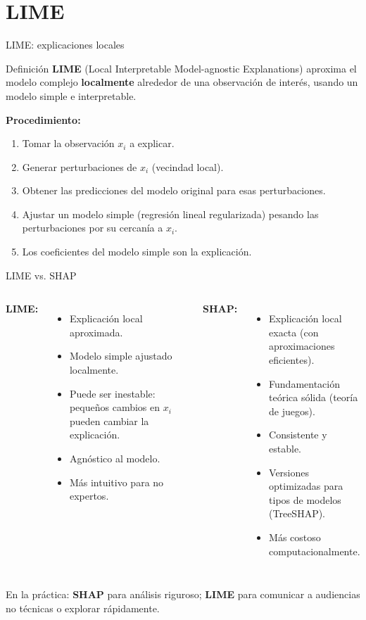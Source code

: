 \documentclass[aspectratio=169]{beamer}
\begin{document}
\section{LIME}

\begin{frame}{LIME: explicaciones locales}
  \begin{block}{Definición}
    \textbf{LIME} (Local Interpretable Model-agnostic Explanations) aproxima el modelo complejo \textbf{localmente} alrededor de una observación de interés, usando un modelo simple e interpretable.
  \end{block}

  \bigskip
  \textbf{Procedimiento:}
  \begin{enumerate}
    \item Tomar la observación $x_i$ a explicar.
    \item Generar perturbaciones de $x_i$ (vecindad local).
    \item Obtener las predicciones del modelo original para esas perturbaciones.
    \item Ajustar un modelo simple (regresión lineal regularizada) pesando las perturbaciones por su cercanía a $x_i$.
    \item Los coeficientes del modelo simple son la explicación.
  \end{enumerate}
\end{frame}

\begin{frame}{LIME vs. SHAP}
  \begin{columns}
      \textbf{LIME:}
      \begin{itemize}
        \item Explicación local aproximada.
        \item Modelo simple ajustado localmente.
        \item Puede ser inestable: pequeños cambios en $x_i$ pueden cambiar la explicación.
        \item Agnóstico al modelo.
        \item Más intuitivo para no expertos.
      \end{itemize}
      \textbf{SHAP:}
      \begin{itemize}
        \item Explicación local exacta (con aproximaciones eficientes).
        \item Fundamentación teórica sólida (teoría de juegos).
        \item Consistente y estable.
        \item Versiones optimizadas para tipos de modelos (TreeSHAP).
        \item Más costoso computacionalmente.
      \end{itemize}
  \end{columns}
  \bigskip
  En la práctica: \textbf{SHAP} para análisis riguroso; \textbf{LIME} para comunicar a audiencias no técnicas o explorar rápidamente.
\end{frame}
\end{document}
